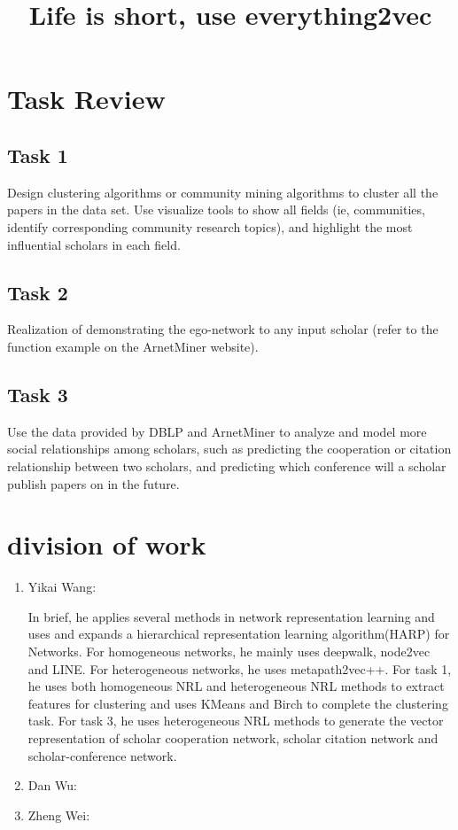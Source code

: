 \documentclass[conference]{IEEEtran}
\begin{document}
\title{Life is short, use everything2vec}
\author{
\and
{}
\IEEEauthorblockA{}
\and
{}
\IEEEauthorblockA{}}
\maketitle
\IEEEpeerreviewmaketitle
\section{Task Review}
\subsection{Task 1}
Design clustering algorithms or community mining algorithms to cluster all the papers in the data set. Use visualize tools to show all fields (ie, communities, identify corresponding community research topics), and highlight the most influential scholars in each field.
\subsection{Task 2}
Realization of demonstrating the ego-network to any input scholar (refer to the function example on the ArnetMiner website).
\subsection{Task 3}
Use the data provided by DBLP and ArnetMiner to analyze and model more social relationships among scholars, such as predicting the cooperation or citation relationship between two scholars, and predicting which conference will a scholar publish papers on in the future.
\section{division of work}
\begin{enumerate}
\item Yikai Wang: 

In brief, he applies several methods in network representation learning and uses and expands a hierarchical representation learning algorithm(HARP) for Networks. For homogeneous networks, he mainly uses deepwalk, node2vec and LINE. For heterogeneous networks, he uses metapath2vec++. For task 1, he uses both homogeneous NRL and heterogeneous NRL methods to extract features for clustering and uses KMeans and Birch to complete the clustering task. For task 3, he uses heterogeneous NRL methods to generate the vector representation of scholar cooperation network, scholar citation network and scholar-conference network.
\item Dan Wu:
\item Zheng Wei:
\end{enumerate}
\end{document}
